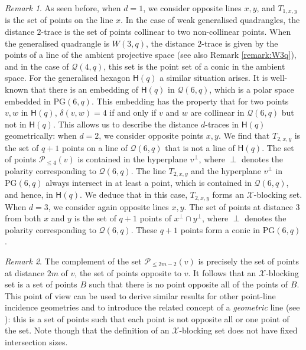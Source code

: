 \documentclass[12pt]{article}
\newcommand{\PG}{\mathrm{PG}}
\newcommand{\Q}{\mathcal{Q}}
\newcommand{\Points}{\mathcal{P}}
\newcommand{\SCHex}{\mathsf{H}}
\theoremstyle{remark}
\newtheorem{remark}{Remark}
\begin{document}
\begin{remark}\label{rem:traces} As seen before, when $d=1$, we consider opposite lines $x,y$, and $T_{1,x,y}$ is the set of points on the line $x$. 
In the case of weak generalised quadrangles, the distance $2$-trace is the set of points collinear to two non-collinear points. When the generalised quadrangle is $W(3,q)$, the distance $2$-trace is given by the points of a line of the ambient projective space (see also Remark \ref{remark:W3q}), and in the case of $\Q(4,q)$, this set is the point set of a conic in the ambient space. For the generalised hexagon $\SCHex(q)$ a similar situation arises. It is well-known that there is an embedding of \(\SCHex(q)\) in $\Q(6,q)$, which is a polar space embedded in $\PG(6,q)$.
This embedding has the property that for two points $v,w$ in $\SCHex(q)$, $\delta(v,w)=4$ if and only if $v$ and $w$ are collinear in $\Q(6,q)$ but not in $\SCHex(q)$.
This allows us to describe the distance $d$-traces in $\SCHex(q)$ geometrically: when $d=2$, we consider opposite points $x,y$. We find that $T_{2,x,y}$ is the set of $q+1$ points on a line of $\Q(6,q)$ that is not a line of $\SCHex(q)$. The set of points $\Points_{\leq 4}(v)$ is contained in the hyperplane $v^\perp$, where $\perp$ denotes the polarity corresponding to $\Q(6,q)$. The line $T_{2,x,y}$ and the hyperplane $v^\perp$ in $\PG(6,q)$ always intersect in at least a point, which is contained in $\Q(6,q)$, and hence, in $\SCHex(q)$. We deduce that in this case, $T_{2,x,y}$ forms an $\mathcal{X}$-blocking set.
When $d=3$, we consider again opposite lines $x,y$. The set of points at distance $3$ from both $x$ and $y$ is the set of $q+1$ points of $x^\perp\cap y^\perp$, where $\perp$ denotes the polarity corresponding to $\Q(6,q)$. These $q+1$ points form a conic in $\PG(6,q)$. 
\end{remark}



\begin{remark}
    The complement of the set $\Points_{\leq 2m-2}(v)$ is precisely the set of points at distance $2m$ of $v$, the set of points opposite to $v$. It follows that an $\mathcal{X}$-blocking set is a set of points $B$ such that there is no point opposite all of the points of $B$. 
    This point of view can be used to derive similar results for other point-line incidence geometries and to introduce the related concept of a  {\em geometric} line (see \cite{Kasikova}): this is a set of points such that each point is not opposite all or one point of the set. Note though that the definition of an $\mathcal{X}$-blocking set does not have fixed intersection sizes.
    \end{remark}
\end{document}
